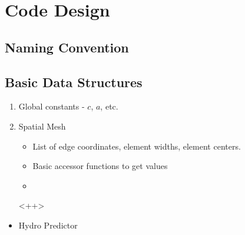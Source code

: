 \documentclass[preprint,12pt]{elsarticle}
\begin{document}
\section{Code Design}

\subsection{Naming Convention}



\subsection{Basic Data Structures}

\begin{enumerate}
    \item Global constants - $c$, $a$, etc.
    \item Spatial Mesh
    \begin{itemize}
        \item List of edge coordinates, element widths, element centers. 
        \item Basic accessor functions to get values
        \item 

    \end{itemize}<++>

\end{enumerate}

\begin{itemize}
    \item Hydro Predictor


\end{itemize}
\end{document}
